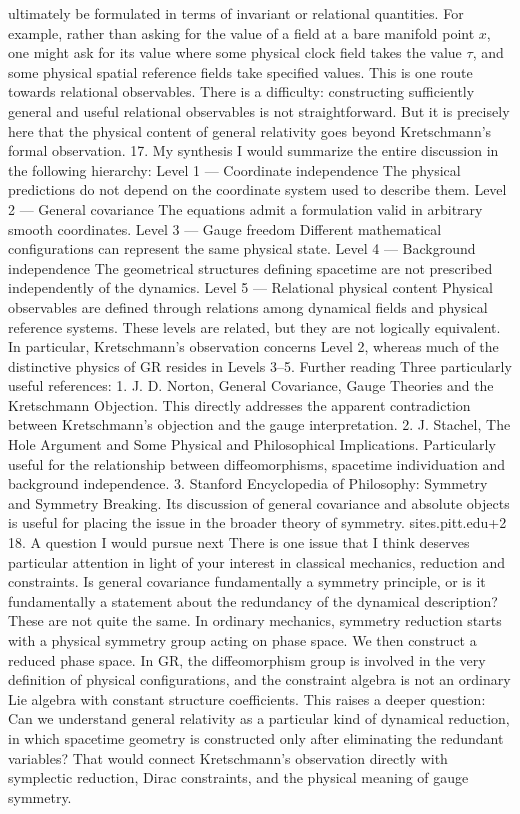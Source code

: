 ultimately be formulated in terms of invariant or relational quantities. For
example, rather than asking for the value of a field at a bare manifold point
\(x\), one might ask for its value where some physical clock field takes the
value \(\tau\), and some physical spatial reference fields take specified
values. This is one route towards relational observables. There is a
difficulty: constructing sufficiently general and useful relational observables
is not straightforward. But it is precisely here that the physical content of
general relativity goes beyond Kretschmann's formal observation. 17. My
synthesis I would summarize the entire discussion in the following hierarchy:
Level 1 — Coordinate independence The physical predictions do not depend on the
coordinate system used to describe them. Level 2 — General covariance The
equations admit a formulation valid in arbitrary smooth coordinates. Level 3 —
Gauge freedom Different mathematical configurations can represent the same
physical state. Level 4 — Background independence The geometrical structures
defining spacetime are not prescribed independently of the dynamics. Level 5 —
Relational physical content Physical observables are defined through relations
among dynamical fields and physical reference systems. These levels are
related, but they are not logically equivalent. In particular, Kretschmann's
observation concerns Level 2, whereas much of the distinctive physics of GR
resides in Levels 3–5. Further reading Three particularly useful references: 1.
J. D. Norton, General Covariance, Gauge Theories and the Kretschmann Objection.
This directly addresses the apparent contradiction between Kretschmann's
objection and the gauge interpretation. 2. J. Stachel, The Hole Argument and
Some Physical and Philosophical Implications. Particularly useful for the
relationship between diffeomorphisms, spacetime individuation and background
independence. 3. Stanford Encyclopedia of Philosophy: Symmetry and Symmetry
Breaking. Its discussion of general covariance and absolute objects is useful
for placing the issue in the broader theory of symmetry. sites.pitt.edu+2 18. A
question I would pursue next There is one issue that I think deserves
particular attention in light of your interest in classical mechanics,
reduction and constraints. Is general covariance fundamentally a symmetry
principle, or is it fundamentally a statement about the redundancy of the
dynamical description? These are not quite the same. In ordinary mechanics,
symmetry reduction starts with a physical symmetry group acting on phase space.
We then construct a reduced phase space. In GR, the diffeomorphism group is
involved in the very definition of physical configurations, and the constraint
algebra is not an ordinary Lie algebra with constant structure coefficients.
This raises a deeper question: Can we understand general relativity as a
particular kind of dynamical reduction, in which spacetime geometry is
constructed only after eliminating the redundant variables? That would connect
Kretschmann's observation directly with symplectic reduction, Dirac
constraints, and the physical meaning of gauge symmetry.
